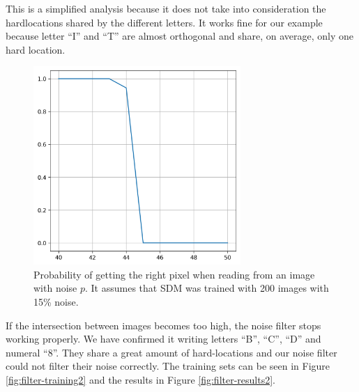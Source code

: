 This is a simplified analysis because it does not take into consideration the hardlocations shared by the different letters. It works fine for our example because letter ``I'' and ``T'' are almost orthogonal and share, on average, only one hard location.

\begin{figure}[!htb]
\centering\includegraphics[width=0.7\textwidth]{./images02/filter/prob-right-pixel.png}
\caption{Probability of getting the right pixel when reading from an image with noise $p$. It assumes that SDM was trained with 200 images with 15\% noise.
\label{fig:filter-prob-right-pixel}
}
\end{figure}

If the intersection between images becomes too high, the noise filter stops working properly. We have confirmed it writing letters ``B'', ``C'', ``D'' and numeral ``8''. They share a great amount of hard-locations and our noise filter could not filter their noise correctly. The training sets can be seen in Figure \ref{fig:filter-training2} and the results in Figure \ref{fig:filter-results2}.

